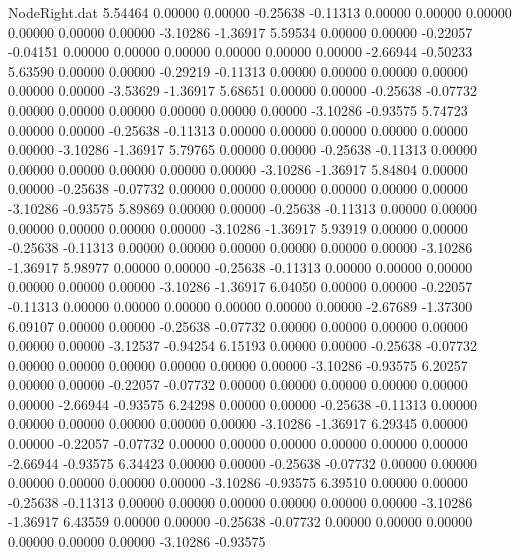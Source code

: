 \begin{filecontents}{NodeRight.dat}
   5.54464    0.00000    0.00000    -0.25638   -0.11313    0.00000    0.00000    0.00000    0.00000    0.00000    0.00000   -3.10286   -1.36917
   5.59534    0.00000    0.00000    -0.22057   -0.04151    0.00000    0.00000    0.00000    0.00000    0.00000    0.00000   -2.66944   -0.50233
   5.63590    0.00000    0.00000    -0.29219   -0.11313    0.00000    0.00000    0.00000    0.00000    0.00000    0.00000   -3.53629   -1.36917
   5.68651    0.00000    0.00000    -0.25638   -0.07732    0.00000    0.00000    0.00000    0.00000    0.00000    0.00000   -3.10286   -0.93575
   5.74723    0.00000    0.00000    -0.25638   -0.11313    0.00000    0.00000    0.00000    0.00000    0.00000    0.00000   -3.10286   -1.36917
   5.79765    0.00000    0.00000    -0.25638   -0.11313    0.00000    0.00000    0.00000    0.00000    0.00000    0.00000   -3.10286   -1.36917
   5.84804    0.00000    0.00000    -0.25638   -0.07732    0.00000    0.00000    0.00000    0.00000    0.00000    0.00000   -3.10286   -0.93575
   5.89869    0.00000    0.00000    -0.25638   -0.11313    0.00000    0.00000    0.00000    0.00000    0.00000    0.00000   -3.10286   -1.36917
   5.93919    0.00000    0.00000    -0.25638   -0.11313    0.00000    0.00000    0.00000    0.00000    0.00000    0.00000   -3.10286   -1.36917
   5.98977    0.00000    0.00000    -0.25638   -0.11313    0.00000    0.00000    0.00000    0.00000    0.00000    0.00000   -3.10286   -1.36917
   6.04050    0.00000    0.00000    -0.22057   -0.11313    0.00000    0.00000    0.00000    0.00000    0.00000    0.00000   -2.67689   -1.37300
   6.09107    0.00000    0.00000    -0.25638   -0.07732    0.00000    0.00000    0.00000    0.00000    0.00000    0.00000   -3.12537   -0.94254
   6.15193    0.00000    0.00000    -0.25638   -0.07732    0.00000    0.00000    0.00000    0.00000    0.00000    0.00000   -3.10286   -0.93575
   6.20257    0.00000    0.00000    -0.22057   -0.07732    0.00000    0.00000    0.00000    0.00000    0.00000    0.00000   -2.66944   -0.93575
   6.24298    0.00000    0.00000    -0.25638   -0.11313    0.00000    0.00000    0.00000    0.00000    0.00000    0.00000   -3.10286   -1.36917
   6.29345    0.00000    0.00000    -0.22057   -0.07732    0.00000    0.00000    0.00000    0.00000    0.00000    0.00000   -2.66944   -0.93575
   6.34423    0.00000    0.00000    -0.25638   -0.07732    0.00000    0.00000    0.00000    0.00000    0.00000    0.00000   -3.10286   -0.93575
   6.39510    0.00000    0.00000    -0.25638   -0.11313    0.00000    0.00000    0.00000    0.00000    0.00000    0.00000   -3.10286   -1.36917
   6.43559    0.00000    0.00000    -0.25638   -0.07732    0.00000    0.00000    0.00000    0.00000    0.00000    0.00000   -3.10286   -0.93575

\end{filecontents}
